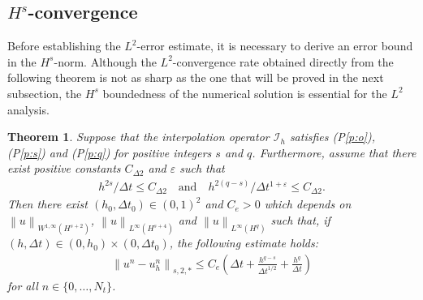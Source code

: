 \documentclass[10pt,a4paper,tbtags,leqno]{amsart}
\newtheorem{theorem}{Theorem}[section]
\theoremstyle{definition}
\numberwithin{equation}{section}
\def\norm#1#2{\left\|#2\right\|_{#1}}
\begin{document}
\subsection{$ H^s $-convergence} 

Before establishing the $L^2$-error estimate, it is necessary to derive an error bound in the $H^s$-norm. Although the $L^2$-convergence rate obtained directly from the following theorem is not as sharp as the one that will be proved in the next subsection, the $H^s$ boundedness of the numerical solution is essential for the $L^2$ analysis. 

\begin{theorem} \label{thm:1} 
  Suppose that the interpolation operator $ \mathcal{I}_{h} $ satisfies (P\ref{p:o}), (P\ref{p:s}) and (P\ref{p:q}) for positive integers $ s $ and $ q $. Furthermore, assume that there exist positive constants $ C_{\Delta 2} $ and $ \varepsilon $ such that 
  \begin{align} 
    h^{2s} / \Delta t \leq C_{\Delta 2} \quad \text{and} \quad h^{2(q - s)} / \Delta t^{1 + \varepsilon} \leq C_{\Delta 2}. \label{hyp:delta} 
  \end{align} 
  Then there exist $ (h_0, \Delta t_0) \in (0, 1)^2 $ and $ C_e > 0 $ which depends on $ \norm{W^{1,\infty}(H^{s + 2})}{u} $, $ \norm{L^{\infty} (H^{s + 4})}{u} $ and $ \norm{L^{\infty}(H^{q})}{u} $ such that, if $ (h, \Delta t) \in (0, h_0) \times (0, \Delta t_0) $, the following estimate holds: 
  \begin{align} 
    \norm{s, 2, \ast}{u^n - u_h^n} \leq C_e \left(\Delta t + \frac{h^{q - s}}{\Delta t^{1/2}} + \frac{h^q}{\Delta t}\right) \label{b30} 
  \end{align} 
  for all $ n \in \{0, \ldots, N_t\} $. 
\end{theorem} 
\end{document}
